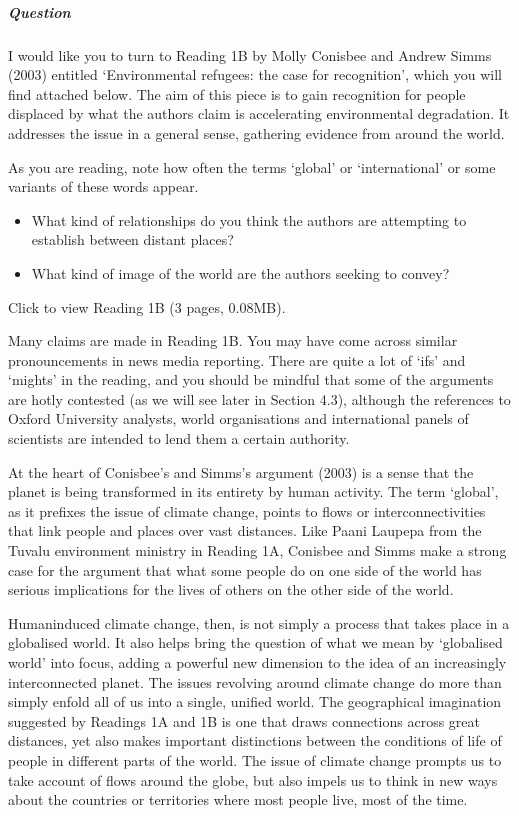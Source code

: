 \documentclass[letterpaper,10pt,english]{sphinxmanual}
\begin{document}
\subparagraph{Question}
\label{\detokenize{content/session_00/Part_00_02:Question}}
I would like you to turn to Reading 1B by Molly Conisbee and Andrew Simms (2003) entitled ‘Environmental refugees: the case for recognition’, which you will find attached below. The aim of this piece is to gain recognition for people displaced by what the authors claim is accelerating environmental degradation. It addresses the issue in a general sense, gathering evidence from around the world.

As you are reading, note how often the terms ‘global’ or ‘international’ or some variants of these words appear.
\begin{itemize}
\item {} 
What kind of relationships do you think the authors are attempting to establish between distant places?

\item {} 
What kind of image of the world are the authors seeking to convey?

\end{itemize}

Click to view Reading 1B (3 pages, 0.08MB).

Many claims are made in Reading 1B. You may have come across similar pronouncements in news media reporting. There are quite a lot of ‘ifs’ and ‘mights’ in the reading, and you should be mindful that some of the arguments are hotly contested (as we will see later in Section 4.3), although the references to Oxford University analysts, world organisations and international panels of scientists are intended to lend them a certain authority.

At the heart of Conisbee’s and Simms’s argument (2003) is a sense that the planet is being transformed in its entirety by human activity. The term ‘global’, as it prefixes the issue of climate change, points to flows or interconnectivities that link people and places over vast distances. Like Paani Laupepa from the Tuvalu environment ministry in Reading 1A, Conisbee and Simms make a strong case for the argument that what some people do on one side of the world has serious implications for the
lives of others on the other side of the world.

Human\sphinxhyphen{}induced climate change, then, is not simply a process that takes place in a globalised world. It also helps bring the question of what we mean by ‘globalised world’ into focus, adding a powerful new dimension to the idea of an increasingly interconnected planet. The issues revolving around climate change do more than simply enfold all of us into a single, unified world. The geographical imagination suggested by Readings 1A and 1B is one that draws connections across great distances, yet
also makes important distinctions between the conditions of life of people in different parts of the world. The issue of climate change prompts us to take account of flows around the globe, but also impels us to think in new ways about the countries or territories where most people live, most of the time.
\end{document}

